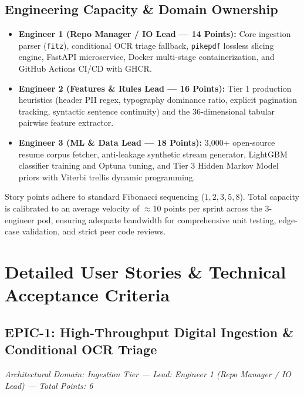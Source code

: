 \documentclass[11pt,a4paper]{article}
\begin{document}
\vspace{1.5em}

\subsection{Engineering Capacity \& Domain Ownership}
\begin{itemize}[leftmargin=1.5em, itemsep=4pt]
    \item \textbf{Engineer 1 (Repo Manager / IO Lead --- 14 Points):} Core ingestion parser (\texttt{fitz}), conditional OCR triage fallback, \texttt{pikepdf} lossless slicing engine, FastAPI microservice, Docker multi-stage containerization, and GitHub Actions CI/CD with GHCR.
    \item \textbf{Engineer 2 (Features \& Rules Lead --- 16 Points):} Tier 1 production heuristics (header PII regex, typography dominance ratio, explicit pagination tracking, syntactic sentence continuity) and the 36-dimensional tabular pairwise feature extractor.
    \item \textbf{Engineer 3 (ML \& Data Lead --- 18 Points):} 3,000+ open-source resume corpus fetcher, anti-leakage synthetic stream generator, LightGBM classifier training and Optuna tuning, and Tier 3 Hidden Markov Model priors with Viterbi trellis dynamic programming.
\end{itemize}

\vspace{1em}

\begin{tcolorbox}[colback=SlateGray!5, colframe=SlateGray, arc=3pt, boxrule=0.8pt, title={\textbf{Velocity \& Sizing Philosophy}}]
\small
Story points adhere to standard Fibonacci sequencing ($1, 2, 3, 5, 8$). Total capacity is calibrated to an average velocity of $\approx 10$ points per sprint across the 3-engineer pod, ensuring adequate bandwidth for comprehensive unit testing, edge-case validation, and strict peer code reviews.
\end{tcolorbox}

\clearpage

\section{Detailed User Stories \& Technical Acceptance Criteria}

\subsection{EPIC-1: High-Throughput Digital Ingestion \& Conditional OCR Triage}
\textit{Architectural Domain: Ingestion Tier --- Lead: Engineer 1 (Repo Manager / IO Lead) --- Total Points: 6}
\end{document}

